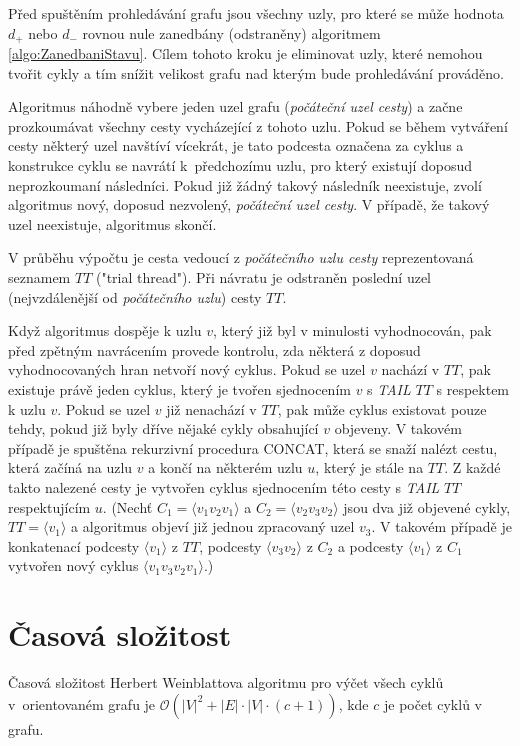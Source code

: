         Před spuštěním prohledávání grafu jsou všechny uzly, pro které se může hodnota $d_+$ nebo $d_-$ rovnou nule zanedbány (odstraněny) algoritmem \ref{algo:ZanedbaniStavu}. Cílem tohoto kroku je eliminovat uzly, které nemohou tvořit cykly a tím snížit velikost grafu nad kterým bude prohledávání prováděno.

        Algoritmus náhodně vybere jeden uzel grafu (\textit{počáteční uzel cesty}) a začne prozkoumávat všechny cesty vycházející z tohoto uzlu. Pokud se během vytváření cesty některý uzel navštíví vícekrát, je tato podcesta označena za cyklus a konstrukce cyklu se navrátí k~předchozímu uzlu, pro který existují doposud neprozkoumaní následníci. Pokud již žádný takový následník neexistuje, zvolí algoritmus nový, doposud nezvolený, \textit{počáteční uzel cesty}. V případě, že takový uzel neexistuje, algoritmus skončí.

        V průběhu výpočtu je cesta vedoucí z \textit{počátečního uzlu cesty} reprezentovaná seznamem $TT$ ("trial thread"). Při návratu je odstraněn poslední uzel (nejvzdálenější od \textit{počátečního uzlu}) cesty $TT$.

        Když algoritmus dospěje k uzlu $v$, který již byl v minulosti vyhodnocován, pak před zpětným navrácením provede kontrolu, zda některá z doposud vyhodnocovaných hran netvoří nový cyklus. Pokud se uzel $v$ nachází v $TT$, pak existuje právě jeden cyklus, který je tvořen sjednocením $v$ s \textit{TAIL} $TT$ s respektem k uzlu $v$. Pokud se uzel $v$ již nenachází v $TT$, pak může cyklus existovat pouze tehdy, pokud již byly dříve nějaké cykly obsahující $v$ objeveny. V takovém případě je spuštěna rekurzivní procedura CONCAT, která se snaží nalézt cestu, která začíná na uzlu $v$ a končí na některém uzlu $u$, který je stále na $TT$. Z každé takto nalezené cesty je vytvořen cyklus sjednocením této cesty s \textit{TAIL} $TT$ respektujícím $u$. (Nechť $C_1 = \langle v_1v_2v_1 \rangle$ a $C_2 = \langle v_2v_3v_2 \rangle$ jsou dva již objevené cykly, $TT = \langle v_1 \rangle$ a algoritmus objeví již jednou zpracovaný uzel $v_3$. V takovém případě je konkatenací podcesty $\langle v_1 \rangle$ z $TT$, podcesty $\langle v_3v_2 \rangle$ z $C_2$ a podcesty $\langle v_1 \rangle$ z $C_1$ vytvořen nový cyklus $\langle v_1v_3v_2v_1 \rangle$.)

    \section{Časová složitost}
        \begin{theorem}
            Časová složitost Herbert Weinblattova algoritmu pro výčet všech cyklů v~orientovaném grafu je $\mathcal{O}(|V|^2 + |E|\cdot|V|\cdot(c + 1))$, kde $c$ je počet cyklů v grafu.
        \end{theorem}

